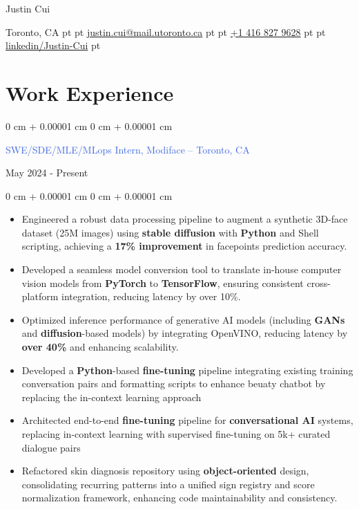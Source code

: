 \documentclass[10pt, letterpaper]{article}
\newenvironment{highlights}{
    \begin{itemize}[
        topsep=0.10 cm,
        parsep=0.10 cm,
        partopsep=0pt,
        itemsep=0pt,
        leftmargin=0 cm + 10pt
    ]
}{
    \end{itemize}
}
\newenvironment{onecolentry}{
    \begin{adjustwidth}{
        0 cm + 0.00001 cm
    }{
        0 cm + 0.00001 cm
    }
}{
    \end{adjustwidth}
}
\newenvironment{twocolentry}[2][]{
    \onecolentry
    \def\secondColumn{#2}
    \setcolumnwidth{\fill, 4.5 cm}
    \begin{paracol}{2}
}{
    \switchcolumn \raggedleft \secondColumn
    \end{paracol}
    \endonecolentry
}
\newenvironment{header}{
    \setlength{\topsep}{0pt}\par\kern\topsep\centering\linespread{1.5}
}{
    \par\kern\topsep
}
\begin{document}
\begin{header}
    \fontsize{25 pt}{25 pt}\selectfont Justin Cui

    \vspace{1 pt}

    \normalsize
    Toronto, CA%
     pt%
    \AND%
     pt%
    \href{mailto:justin.cui@mail.utoronto.ca}{justin.cui@mail.utoronto.ca}%
     pt%
    \AND%
     pt%
    \href{tel:+1-416-827-9628}{+1 416 827 9628}%
     pt%
    \AND%
     pt%
    \href{https://www.linkedin.com/in/justin-cui-b7b654181/}{linkedin/Justin-Cui}%
     pt%

\end{header}

\vspace{5 pt - 0.3 cm}

\section{Work Experience}
\vspace{0.10 cm}
\begin{twocolentry}{May 2024 - Present}
    {\textcolor{royalblue}{SWE/SDE/MLE/MLops Intern, Modiface -- Toronto, CA}}
\end{twocolentry}
\vspace{0.05 cm}
\begin{onecolentry}
    \begin{highlights}
        \item Engineered a robust data processing pipeline to augment a synthetic 3D-face dataset (25M images) using  \textbf{ stable diffusion} with \textbf{Python} and Shell scripting, achieving a \textbf{17\% improvement }in facepoints prediction accuracy.
        \item Developed a seamless model conversion tool to translate in-house computer vision models from \textbf{PyTorch} to \textbf{TensorFlow}, ensuring consistent cross-platform integration, reducing latency by over 10\%.
        \item Optimized inference performance of generative AI models (including \textbf{GANs} and \textbf{diffusion}-based models) by integrating OpenVINO, reducing latency by \textbf{over 40\%} and enhancing scalability.
        \item Developed a \textbf{Python}-based\textbf{ fine-tuning} pipeline integrating existing training conversation pairs and formatting scripts to enhance beuaty chatbot by replacing the in-context learning approach
        \item Architected end-to-end\textbf{ fine-tuning }pipeline for \textbf{conversational AI }systems, replacing in-context learning with supervised fine-tuning on 5k+ curated dialogue pairs
        \item Refactored skin diagnosis repository using \textbf{object-oriented} design, consolidating recurring patterns into a unified sign registry and score normalization framework, enhancing code maintainability and consistency.
    \end{highlights}
\end{onecolentry}
\end{document}
